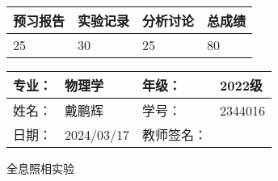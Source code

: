\documentclass[dvipsnames, svgnames,a4paper,11pt]{article}
\begin{document}
\begin{table}
	\renewcommand\arraystretch{1.7}
	\begin{tabularx}{\textwidth}{
		|X|X|X|X
		|X|X|X|X|}
	\hline
	\multicolumn{2}{|c|}{预习报告}&\multicolumn{2}{|c|}{实验记录}&\multicolumn{2}{|c|}{分析讨论}&\multicolumn{2}{|c|}{总成绩}\\
	\hline
	\LARGE25 & & \LARGE30 & & \LARGE25 & & \LARGE80 & \\
	\hline
	\end{tabularx}
\end{table}


\begin{table}
	\renewcommand\arraystretch{1.7}
	\begin{tabularx}{\textwidth}{|X|X|X|X|}
	\hline
	专业：& 物理学 &年级：& 2022级\\
	\hline
	姓名：& 戴鹏辉  & 学号： & 2344016 \\
	\hline
	日期：& 2024/03/17 & 教师签名：& \\
	\hline
	\end{tabularx}
\end{table}

\begin{center}
	\LARGE 全息照相实验
\end{center}
\end{document}

